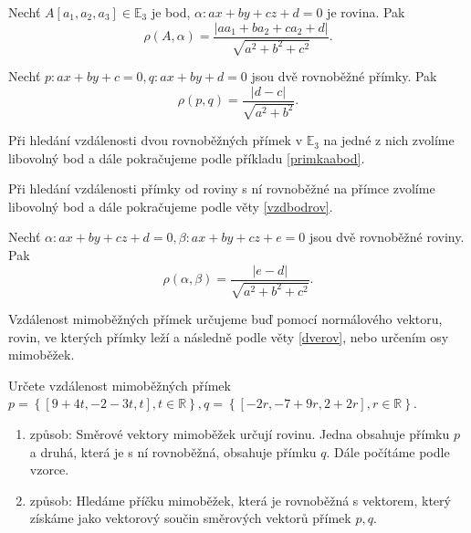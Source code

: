 \begin{veta}\label{vzdbodrov}
    Nechť $A[a_1,a_2,a_3]\in \mathbb E_3$ je bod, $\alpha:ax+by+cz+d=0$ je rovina. Pak
    $$\rho(A,\alpha)=\frac{|aa_1+ba_2+ca_2+d|}{\sqrt{a^2+b^2+c^2} }.$$
\end{veta}

\begin{veta}\label{vzdpr}
    Nechť $p:ax+by+c=0,q:ax+by+d=0$ jsou dvě rovnoběžné přímky. Pak
    $$\rho(p,q)=\frac{|d-c|}{\sqrt{a^2+b^2} }.$$
\end{veta}

\begin{pozn}
    Při hledání vzdálenosti dvou rovnoběžných přímek v $\mathbb E_3$ na jedné z nich zvolíme
    libovolný bod a dále pokračujeme podle příkladu \ref{primkaabod}.
\end{pozn}

\begin{pozn}
    Při hledání vzdálenosti přímky od roviny s ní rovnoběžné na přímce zvolíme
    libovolný bod a dále pokračujeme podle věty \ref{vzdbodrov}.
\end{pozn}

\begin{veta}\label{dverov}
    Nechť $\alpha:ax+by+cz+d=0,\beta:ax+by+cz+e=0$ jsou dvě rovnoběžné roviny. Pak
    $$\rho(\alpha,\beta)=\frac{|e-d|}{\sqrt{a^2+b^2+c^2} }.$$
\end{veta}

\begin{pozn}
    Vzdálenost mimoběžných přímek určujeme buď pomocí normálového vektoru, rovin,
    ve kterých přímky leží a následně podle věty \ref{dverov}, nebo určením
    osy mimoběžek.
\end{pozn}

\begin{priklad}
Určete vzdálenost mimoběžných přímek $p=\left \{ [9+4t,-2-3t,t],t \in \mathbb R \right \} ,q=\left \{ [-2r,-7+9r,2+2r],r \in \mathbb R \right \} $.
\end{priklad}

\begin{reseni}
\begin{enumerate}[1.]
\item způsob: Směrové vektory mimoběžek určují rovinu. Jedna obsahuje přímku $p$ a druhá,
která je s ní rovnoběžná, obsahuje přímku $q$. Dále počítáme podle vzorce.
\item způsob: Hledáme příčku mimoběžek, která je rovnoběžná s vektorem, který
získáme jako vektorový součin směrových vektorů přímek $p,q$.
\end{enumerate}
\end{reseni}

